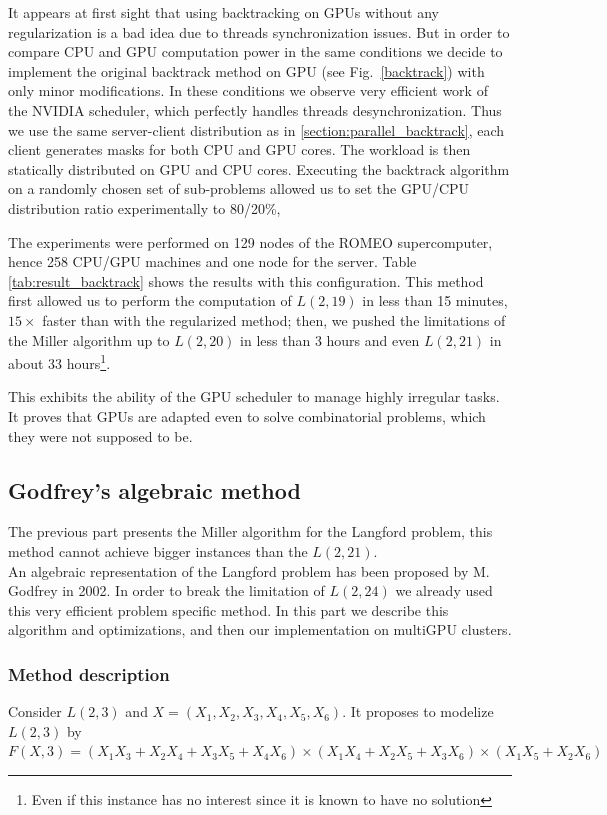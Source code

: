 It appears at first sight that using backtracking on GPUs without any regularization is a bad idea due to threads synchronization issues.
But in order to compare CPU and GPU computation power in the same conditions we decide to implement the original backtrack method on GPU (see Fig.~\ref{backtrack}) with only minor modifications.
In these conditions we observe very efficient work of the NVIDIA scheduler, which perfectly handles threads desynchronization.
Thus we use the same server-client distribution as in \ref{section:parallel_backtrack}, each client generates masks for both CPU and GPU cores. 
The workload is then statically distributed on GPU and CPU cores.
Executing the backtrack algorithm on a randomly chosen set of sub-problems allowed us to set the GPU/CPU distribution ratio experimentally to 80/20\%, 

The experiments were performed on 129 nodes of the ROMEO supercomputer, hence 258 CPU/GPU machines and one node for the server. 
Table \ref{tab:result_backtrack} shows the results with this configuration. 
This method first allowed us to perform the computation of $L(2,19)$ in less than 15 minutes, $15\times$ faster than with the regularized method; then, we pushed the limitations of the Miller algorithm up to $L(2,20)$ in less than 3 hours and even $L(2,21)$ in about $33$ hours\footnote{Even if this instance has no interest since it is known to have no solution}.

This exhibits the ability of the GPU scheduler to manage highly irregular tasks. It proves that GPUs are adapted even to solve combinatorial problems, which they were not supposed to be.

\subsection{Godfrey's algebraic method}
The previous part presents the Miller algorithm for the Langford problem, this method cannot achieve bigger instances than the $L(2,21)$.\\
An algebraic representation of the Langford problem has been proposed by M. Godfrey in 2002.
In order to break the limitation of $L(2,24)$ we already used this very efficient problem specific method.
In this part we describe this algorithm and optimizations, and then our implementation on multiGPU clusters.
\subsubsection{Method description}
Consider $L(2,3)$ and $X=(X_1,X_2,X_3,X_4,X_5,X_6)$. 
It proposes to modelize $L(2,3)$ by 
$F(X,3) = (X_1X_3+X_2X_4+X_3X_5+X_4X_6)\times (X_1X_4+X_2X_5+X_3X_6)\times (X_1X_5+X_2X_6) $

